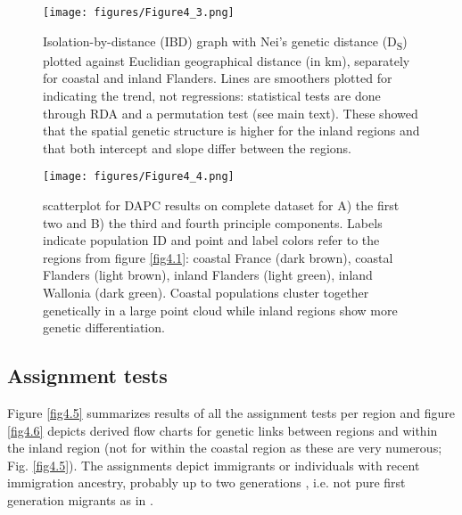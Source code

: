 \documentclass[10pt, twoside]{book} %
\begin{document}
	\begin{figure}[h!]
		\begin{center}
			\texttt{[image: figures/Figure4\_3.png]}
		\end{center}
		\begin{footnotesize}
			\caption{Isolation-by-distance (IBD) graph with Nei's genetic distance (D\textsubscript{S}) plotted against Euclidian geographical distance (in km), separately for coastal and inland Flanders. Lines are smoothers plotted for indicating the trend, not regressions: statistical tests are done through RDA and a permutation test (see main text). These showed that the spatial genetic structure is higher for the inland regions and that both intercept and slope differ between the regions. \label{fig4.3}}
		\end{footnotesize}
	\end{figure}
	
	\begin{figure}[h!]
		\begin{center}
			\texttt{[image: figures/Figure4\_4.png]}
		\end{center}
		\begin{footnotesize}
			\caption{scatterplot for DAPC results on complete dataset for A) the first two and B) the third and fourth principle components. Labels indicate population ID and point and label colors refer to the regions from figure \ref{fig4.1}: coastal France (dark brown), coastal Flanders (light brown), inland Flanders (light green), inland Wallonia (dark green). Coastal populations cluster together genetically in a large point cloud while inland regions show more genetic differentiation. \label{fig4.4}}
		\end{footnotesize}
	\end{figure}
\clearpage
	
	\subsection{Assignment tests}
	Figure \ref{fig4.5} summarizes results of all the assignment tests per region and figure \ref{fig4.6} depicts derived flow charts for genetic links between regions and within the inland region (not for within the coastal region as these are very numerous; Fig. \ref{fig4.5}). The assignments depict immigrants or individuals with recent immigration ancestry, probably up to two generations \citep{rannala1997}, i.e. not pure first generation migrants as in \citet{paetkau2004}.\\
	
\end{document}
